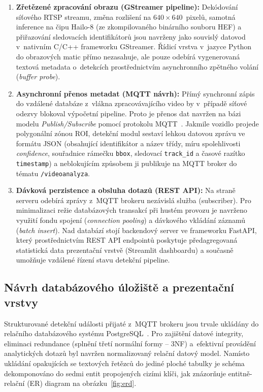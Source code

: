\begin{enumerate}
    \item \textbf{Zřetězené zpracování obrazu (GStreamer pipeline):} Dekódování síťového \acs{RTSP} streamu, změna rozlišení na $640 \times 640$~pixelů, samotná inference na čipu Hailo-8 (ze zkompilovaného binárního souboru \acs{HEF}) a přiřazování sledovacích identifikátorů jsou navrženy jako souvislý datovod v~nativním C/C++ frameworku GStreamer. Řídicí vrstva v~jazyce Python do obrazových matic přímo nezasahuje, ale pouze odebírá vygenerovaná textová metadata o~detekcích prostřednictvím asynchronního zpětného volání (\textit{buffer probe}).
    \item \textbf{Asynchronní přenos metadat (MQTT návrh):} Přímý synchronní zápis do vzdálené databáze z~vlákna zpracovávajícího video by v~případě síťové odezvy blokoval výpočetní pipeline. Proto je přenos dat navržen na bázi modelu \textit{Publish/Subscribe} pomocí protokolu \acs{MQTT}~\cite{mqtt_oasis_2019}. Jakmile vozidlo projede polygonální zónou ROI, detekční modul sestaví lehkou datovou zprávu ve formátu \acs{JSON} (obsahující identifikátor a název třídy, míru spolehlivosti \textit{confidence}, souřadnice rámečku \texttt{bbox}, sledovací \texttt{track\_id} a časové razítko \texttt{timestamp}) a neblokujícím způsobem ji publikuje na MQTT broker do tématu \texttt{/videoanalyza}.
    \item \textbf{Dávková perzistence a obsluha dotazů (\acs{REST} \acs{API}):} Na straně serveru odebírá zprávy z~MQTT brokeru nezávislá služba (subscriber). Pro minimalizaci režie databázových transakcí při hustém provozu je navrženo využití fondu spojení (\textit{connection pooling}) a dávkového vkládání záznamů (\textit{batch insert}). Nad databází stojí backendový server ve frameworku FastAPI, který prostřednictvím REST API endpointů poskytuje předagregovaná statistická data prezentační vrstvě (Streamlit dashboardu) a současně umožňuje vzdálené řízení stavu detekční pipeline.
\end{enumerate}

\subsection{Návrh databázového úložiště a prezentační vrstvy}
Strukturované detekční události přijaté z~MQTT brokeru jsou trvale ukládány do relačního databázového systému PostgreSQL~\cite{psycopg_docs_2025}. Pro zajištění datové integrity, eliminaci redundance (splnění třetí normální formy – 3NF) a~efektivní provádění analytických dotazů byl navržen normalizovaný relační datový model. Namísto ukládání opakujících se textových řetězců do jediné ploché tabulky je schéma dekomponováno do sedmi entit propojených cizími klíči, jak znázorňuje entitně-relační (\acs{ER}) diagram na obrázku~\ref{fig:erd}.

